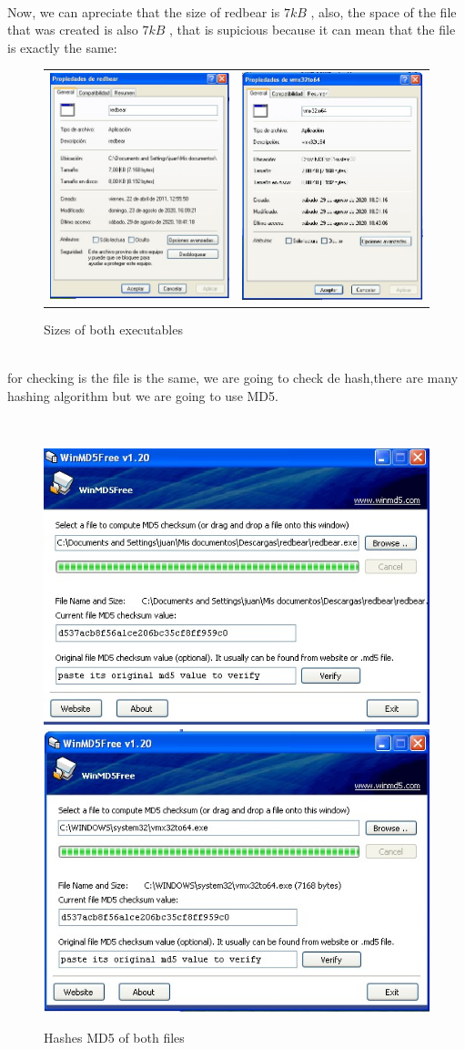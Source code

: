\documentclass[10pt,a4paper]{article} %
\begin{document}
        \\ Now, we can apreciate that the size of redbear is $ 7kB  $  , also,
        the space of the file that was created is also $ 7kB  $ , that is
        supicious because it can mean that the file is exactly the same:
        \\
        \begin {figure} [h]
        \centering
        \begin {tabular}{c c}
        \includegraphics[width=0.3\linewidth]{img1.jpeg}
        &
        \includegraphics[width=0.3\linewidth]{img2.jpeg}
        \end {tabular}
        \caption{Sizes of both executables}
        \end {figure}
        \\
        for checking is the file is the same, we are going to check de
        hash,there are many hashing algorithm but we are going to use MD5.

        \\
        \begin{figure}[h]
            \centering
            \includegraphics[width=0.4\linewidth]{hash1.jpeg}
            \includegraphics[width=0.4\linewidth]{hash2.jpeg}
            \\
            \caption{Hashes MD5 of both files}
            \label{hashes}
        \end{figure}
\end{document}
